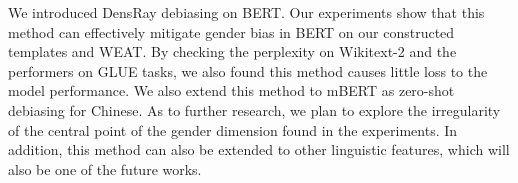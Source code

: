 We introduced DensRay debiasing on BERT. Our experiments
show that this method can effectively mitigate gender bias
in BERT on our constructed templates and WEAT. By checking
the perplexity on Wikitext-2 and the performers on GLUE
tasks, we also found this method causes little loss to the
model performance. We also extend this method to mBERT as
zero-shot debiasing for Chinese. As to further research, we
plan to explore the irregularity of the central point of the
gender dimension found in the experiments. In addition, this
method can also be extended to other linguistic features,
which will also be one of the future works.

